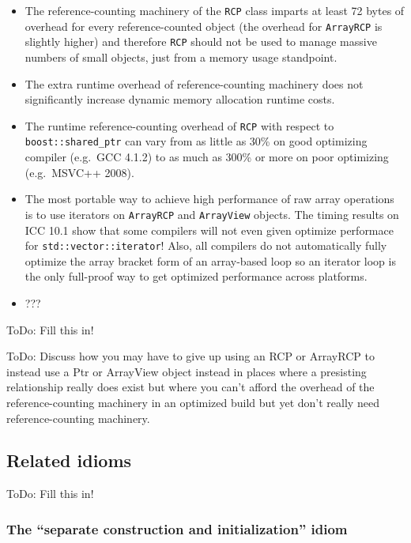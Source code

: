 \documentclass[pdf,ps2pdf,11pt]{SANDreport}
\begin{document}
\begin{itemize}

{}\item The reference-counting machinery of the {}\texttt{RCP} class
imparts at least 72 bytes of overhead for every reference-counted
object (the overhead for {}\texttt{ArrayRCP} is slightly higher) and
therefore {}\texttt{RCP} should not be used to manage massive numbers
of small objects, just from a memory usage standpoint.

{}\item The extra runtime overhead of reference-counting machinery
does not significantly increase dynamic memory allocation runtime
costs.

{}\item The runtime reference-counting overhead of {}\texttt{RCP} with
respect to {}\texttt{boost::shared\_ptr} can vary from as little as
30\% on good optimizing compiler (e.g.\ GCC 4.1.2) to as much as 300\%
or more on poor optimizing (e.g.\ MSVC++ 2008).

{}\item The most portable way to achieve high performance of raw array
operations is to use iterators on {}\texttt{ArrayRCP} and
{}\texttt{ArrayView} objects.  The timing results on ICC 10.1 show
that some compilers will not even given optimize performace for
{}\texttt{std::vector::iterator}!  Also, all compilers do not
automatically fully optimize the array bracket form of an array-based
loop so an iterator loop is the only full-proof way to get optimized
performance across platforms.

{}\item ???

\end{itemize}

ToDo: Fill this in!

ToDo: Discuss how you may have to give up using an RCP or ArrayRCP to
instead use a Ptr or ArrayView object instead in places where a
presisting relationship really does exist but where you can't afford
the overhead of the reference-counting machinery in an optimized build
but yet don't really need reference-counting machinery.


%
{}\subsection{Related idioms}
%

ToDo: Fill this in!


%
{}\subsubsection{The ``separate construction and initialization'' idiom}
\label{sec:separate-construct-init}
%
\end{document}
